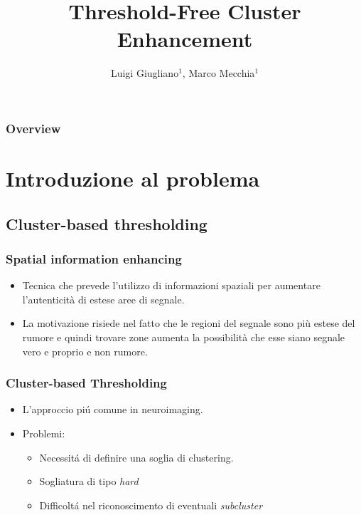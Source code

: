 \documentclass{beamer}
\title{Threshold-Free Cluster Enhancement}
\author{Luigi Giugliano$^1$, Marco Mecchia$^1$}
\institute{$^1$Università degli studi di Salerno}
\begin{document}
\begin{frame}
   \maketitle
\end{frame}

\begin{frame}
  \frametitle{Overview}
  \footnotesize \tableofcontents
\end{frame}


\section{Introduzione al problema}

\subsection{Cluster-based thresholding}
\begin{frame}
\frametitle{Spatial information enhancing}
\begin{itemize}

\item Tecnica che prevede l'utilizzo di informazioni spaziali per aumentare l'autenticità di estese aree di segnale. 
\vfill
\item La motivazione risiede nel fatto che le regioni del segnale sono più estese del rumore e quindi trovare zone aumenta la possibilità che esse siano segnale vero e proprio e non rumore.
\end{itemize}

\end{frame}

\begin{frame}
\frametitle{Cluster-based Thresholding}
\begin{itemize}
\item L'approccio pi\'u comune in neuroimaging.
\vfill
\item Problemi:
\begin{itemize}
\item Necessit\'a di definire una soglia di clustering.
\item Sogliatura di tipo \emph{hard}
\item Difficolt\'a nel riconoscimento di eventuali \emph{subcluster}
\end{itemize}
\end{itemize}
\end{frame}
\end{document}
